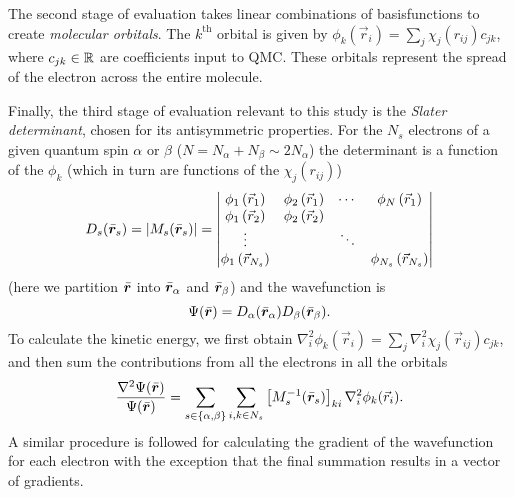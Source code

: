 \documentclass[11pt]{article}
\begin{document}
The second stage of evaluation takes linear combinations of
basisfunctions to create \emph{molecular orbitals}. The
$k^\textrm{th}$ orbital is given by $\phi_{k}( \vec{r}_i ) = \sum_j
\chi_{j} (r_{ij}) c_{jk}$, where $c_{jk} \in \mbox{$\mathbb R$}$ are coefficients
input to QMC. These orbitals represent the spread of the electron
across the entire molecule.

Finally, the third stage of evaluation relevant to this study is the
\emph{Slater determinant}, chosen for its antisymmetric properties.
For the $N_s$ electrons of a given quantum spin $\alpha$ or $\beta$
($N = N_\alpha + N_\beta \sim 2 N_\alpha$) the determinant is a
function of the $\phi_k$ (which in turn are functions of the $\chi_{j} (r_{ij}) $)
\begin{equation} \label{eq:slaterd}
D_{s} (\bar{\bm r}_s)  = |M_s(\bar{\bm r}_s)| = \begin {vmatrix}
\phi_1 \left( \vec{r}_1 \right) & \phi_2 \left( \vec{r}_1 \right)
& \cdots & \phi_N \left( \vec{r}_1 \right) \\
\phi_1 \left( \vec{r}_2 \right) & \phi_2 \left( \vec{r}_2 \right) & & \\
\vdots & & \ddots & \\
\phi_1 \left( \vec{r}_{N_s} \right) & & & \phi_{N_s} \left( \vec{r}_{N_s} \right)
\end{vmatrix}
\end{equation}
(here we partition $\bar{\bm r}$ into $\bar{\bm r}_\alpha$ and $\bar{\bm r}_\beta$)
and the wavefunction is
\[
\Psi(\bar{\bm r}) = D_\alpha(\bar{\bm r}_\alpha)D_\beta(\bar{\bm r}_\beta).
\]
To calculate the kinetic energy, we first obtain $\nabla^2_i \phi_{k}(
\vec{r}_i ) = \sum_j \nabla^2_i \chi_{j} (\vec{r}_{ij}) c_{jk}$, and
then sum the contributions from all the electrons in all the orbitals
\begin{equation} \label{eq:matrixdot}
\frac{\nabla^2 \Psi(\bar{\bm r})}{\Psi(\bar{\bm r})} =
\sum_{s \in \{\alpha, \beta\}} \sum_{i,k \in N_s}
\left[M_s^{-1}(\bar{\bm r}_s)\right]_{ki}
\nabla^2_i \phi_{k}( \vec{r}_i ).
\end{equation}
A similar procedure is followed for calculating the gradient of the
wavefunction for each electron with the exception that the final
summation results in a vector of gradients.
\end{document}
